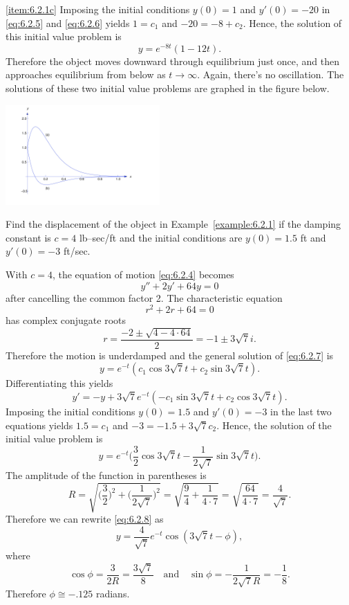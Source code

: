 \documentclass{ximera}
\begin{document}
\begin{example}
\begin{explanation}
\ref{item:6.2.1c}
Imposing the initial conditions $y(0)=1$ and $y'(0)=-20$ in
\eqref{eq:6.2.5} and \eqref{eq:6.2.6} yields $1=c_1$ and $-20=-8+c_2$. Hence,
the solution of this initial value problem is
$$
y=e^{-8t}(1-12t).
$$
Therefore the object moves downward through equilibrium just once,
and then approaches equilibrium from below as $t\rightarrow\infty$. Again,
there's no oscillation. The solutions of these two initial value
problems are graphed in the figure below.
 
\begin{image}
  \includegraphics[height=1.5in]{fig060202.jpg}
\end{image}
 
\end{explanation}
\end{example}
 
\begin{example}
\label{example:6.2.2}
Find the displacement of the object in Example~\ref{example:6.2.1} if the
damping constant is $c=4$ lb--sec/ft and the initial conditions are
$y(0)=1.5$ ft and $y'(0)=-3$ ft/sec.
 
\begin{explanation}
With $c=4$, the equation of motion \eqref{eq:6.2.4} becomes
\begin{equation}\label{eq:6.2.7}
y''+2y'+64y=0
\end{equation}
after cancelling the common factor 2. The characteristic equation
$$
r^2+2r+64=0
$$
has complex conjugate roots
$$
r=\frac{-2\pm\sqrt{4-4\cdot64}}{2}=-1\pm3\sqrt7i.
$$
Therefore the motion is underdamped and the
general solution of  \eqref{eq:6.2.7} is
$$
y=e^{-t}(c_1\cos3\sqrt7t+c_2\sin3\sqrt7t).
$$
Differentiating this yields
$$
y'=-y+3\sqrt7e^{-t}(-c_1\sin3\sqrt7t+c_2\cos3\sqrt7t).
$$
Imposing the initial conditions $y(0)=1.5$ and $y'(0)=-3$ in the last
two equations yields $1.5=c_1$ and $-3=-1.5+3\sqrt7c_2$. Hence, the
solution of the initial value problem is
\begin{equation}\label{eq:6.2.8}
y=e^{-t}\bigg(\frac{3}{2}\cos3\sqrt7t-\frac{1}{2\sqrt7}
\sin3\sqrt7t\bigg).
\end{equation}
 The amplitude of the function in parentheses is
$$
 R=\sqrt{\bigg(\frac{3}{2}\bigg)^2+\bigg(\frac{1}{2\sqrt7}\bigg)^2}
=\sqrt{\frac{9}{4}+\frac{1}{4\cdot7}}
=\sqrt{\frac{64}{4\cdot7}}=\frac{4}{\sqrt7}.
$$
Therefore we can rewrite  \eqref{eq:6.2.8} as
$$
y=\frac{4}{\sqrt7}e^{-t}\cos(3\sqrt7t-\phi),
$$
 where
$$
\cos\phi=\frac{3}{2R}=\frac{3\sqrt{7}}{8}\quad\mbox{and}\quad\sin\phi=-\frac{1}{2\sqrt{7}R}=
-\frac{1}{8}.
$$
Therefore $\phi\cong-.125$  radians.
\end{explanation}
\end{example}
 
\end{document}
